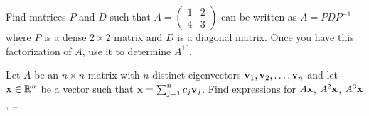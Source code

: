\begin{problem}
    Find matrices $P$ and $D$ such that $A = \begin{pmatrix} 1 & 2 \\ 4 & 3 \end{pmatrix}$
        can be written as $A = PDP^{-1}$ where $P$ is a dense $2 \times 2$ matrix and $D$
        is a diagonal matrix.  Once you have this factorization of $A$, use it to
        determine $A^{10}$.
\end{problem}

\begin{problem}
    Let $A$ be an $n \times n$ matrix with $n$ distinct eigenvectors ${\bf v}_1, {\bf v}_2, \dots,
    {\bf v}_n$ and let ${\bf x} \in \mathbb{R}^n$ be a vector such that ${\bf x} = \sum_{j=1}^n c_j
    {\bf v}_j$. Find expressions for $A{\bf x}$, $A^2 {\bf x}$, $A^3{\bf x}$, \dots
\end{problem}

